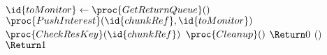 \begin{codebox}
	\li \(\id{toMonitor} \gets \proc{GetReturnQueue}()\)
	\li \(\proc{PushInterest}(\id{chunkRef}, \id{toMonitor})\)
	\li \If \(\proc{CheckResKey}(\id{chunkRef})\)
	\li \Then
	\(\proc{Cleanup}()\)
	\li \(\Return 0\)
	\li \Else
	()
	\li \(\Return 1\)
\end{codebox}

